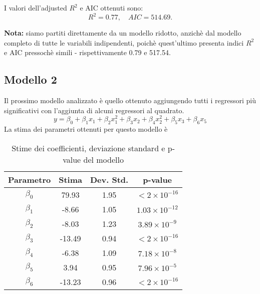 I valori dell'adjusted $R^2$  e AIC ottenuti sono:
\begin{equation*}
	R^2 =  0.77, \quad AIC = 514.69.
\end{equation*}

\textbf{Nota:} siamo partiti direttamente da un modello ridotto, anzichè dal modello completo di tutte le variabili indipendenti, poichè quest'ultimo presenta indici $R^2$ e AIC pressochè simili - rispettivamente 0.79 e 517.54.

\subsection{Modello 2}
Il prossimo modello analizzato è quello ottenuto aggiungendo tutti i regressori più significativi con l'aggiunta di alcuni regressori al quadrato.
\begin{equation*}
	y=\beta_0 + \beta_1x_1+\beta_2x_1^2+\beta_3x_2+\beta_4x_2^2+\beta_5x_3+\beta_6x_5
\end{equation*}
La stima dei parametri ottenuti per questo modello è
\begin{table}[H]
	\centering
	\begin{tabular}{|c|c|c|c|}
		\hline
		\textbf{Parametro} & \textbf{Stima} & \textbf{Dev. Std.} & \textbf{p-value} \\
		\hline
		$\beta_0$ & 79.93   & 1.95   & \(< 2 \times 10^{-16}\) \\
		$\beta_1$ & -8.66   & 1.05   & \(1.03 \times 10^{-12}\) \\
		$\beta_2$ & -8.03   & 1.23   & \(3.89 \times 10^{-9}\) \\
		$\beta_3$ & -13.49  & 0.94   & \(< 2 \times 10^{-16}\) \\
		$\beta_4$ & -6.38   & 1.09   & \(7.18 \times 10^{-8}\) \\
		$\beta_5$ & 3.94    & 0.95   & \(7.96 \times 10^{-5}\) \\
		$\beta_6$ & -13.23  & 0.96   & \(< 2 \times 10^{-16}\) \\
		\hline
	\end{tabular}
	\caption{Stime dei coefficienti, deviazione standard e p-value del modello}
	\label{tab:coef_estimates}
\end{table}


